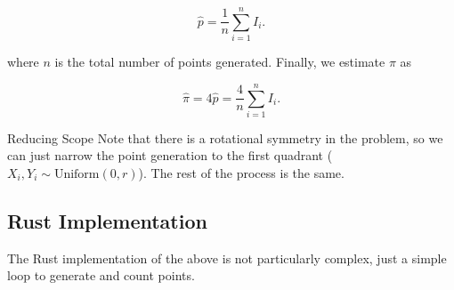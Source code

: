 \[
    \hat{p} = \frac{1}{n} \sum_{i=1}^n I_i.
\]

where $n$ is the total number of points generated. Finally, we estimate $\pi$ as

\[
    \hat{\pi} = 4 \hat{p} = \frac{4}{n} \sum_{i=1}^n I_i.
\]


\begin{note}{Reducing Scope}{}
    Note that there is a rotational symmetry in the problem, so we can just
    narrow the point generation to the first quadrant
    ($X_i, Y_i \sim \text{Uniform}(0, r)$). The rest of the process is the same.
\end{note}

\subsection{Rust Implementation}

The Rust implementation of the above is not particularly complex, just a simple
loop to generate and count points.
